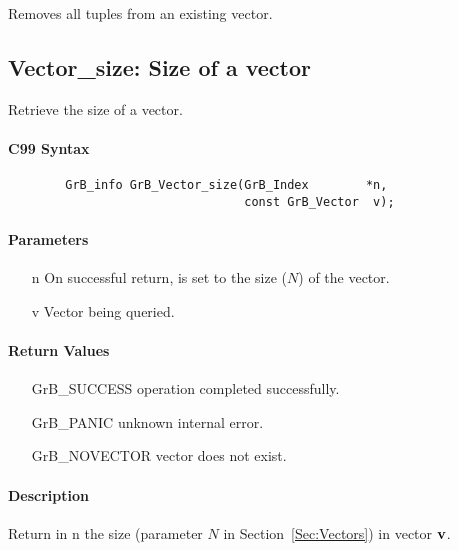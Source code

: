 Removes all tuples from an existing vector.

\subsection{{\sf Vector\_size}: Size of a vector}

Retrieve the size of a vector.

\paragraph{C99 Syntax}

\begin{verbatim}
        GrB_info GrB_Vector_size(GrB_Index        *n,
                                 const GrB_Vector  v);
\end{verbatim}

\paragraph{Parameters}

\begin{itemize}[leftmargin=1.1in]
    \item[{\sf n}] On successful return, is set to the size ($N$) of the vector.
    \item[{\sf v}] Vector being queried.
\end{itemize}

\paragraph{Return Values}

\begin{itemize}[leftmargin=2.1in]
\item[{\sf GrB\_SUCCESS}]   operation completed successfully.
\item[{\sf GrB\_PANIC}]     unknown internal error.
\item[{\sf GrB\_NOVECTOR}]  vector does not exist.
\end{itemize}

\paragraph{Description}

Return in {\sf n} the size (parameter $N$ in Section~\ref{Sec:Vectors}) in vector ${\bf v}$.


